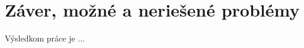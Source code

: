 \documentclass[12pt]{article}
\begin{document}



\clearpage
\section{Záver, možné a neriešené problémy}
Výsledkom práce je ...

\newpage

\listoffigures


\listoftables

\nocite{*}
{}

    
\end{document}
